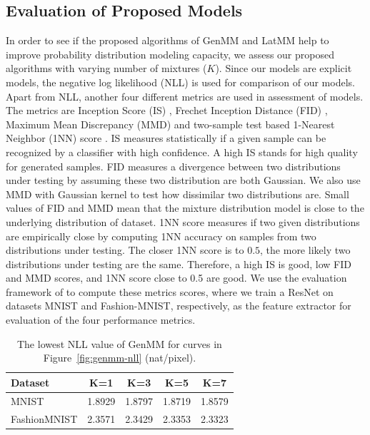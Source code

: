 \subsection{Evaluation of Proposed Models}\label{chpt6:sec:eval-metrics}
In order to see if the proposed algorithms of GenMM and LatMM help to improve probability distribution modeling capacity, we assess our proposed algorithms with varying number of mixtures ($K$). Since our models are explicit models, the negative log likelihood (NLL) is used for comparison of our models. Apart from NLL, another four different metrics are used in assessment of models.
The metrics are Inception Score (IS) \cite{NIPS2016_6125,2018arXiv180101973B,2018arXiv180607755X}, Frechet
Inception Distance (FID) \cite{2017arXiv170608500H}, Maximum Mean
Discrepancy (MMD) \cite{2018arXiv180607755X} and two-sample test based 1-Nearest
Neighbor (1NN) score \cite{2016arXiv161006545L}. IS measures statistically if a given sample can be recognized by a classifier with high confidence. A high IS stands for high quality for generated samples. FID measures a divergence between two distributions under testing by assuming these two distribution are both Gaussian. We also use MMD with Gaussian kernel to test how dissimilar two distributions are.
Small values of FID and MMD mean that the mixture distribution model
is close to the underlying distribution of dataset. 1NN score measures
if two given distributions are empirically close by computing 1NN accuracy
on samples from two distributions under testing. The closer 1NN score is to $0.5$, the more likely 
two distributions under testing are the same. Therefore, a high IS is good, low FID and MMD scores, and 1NN score close to 0.5 are good. We use the evaluation
framework of \cite{2018arXiv180607755X} to compute these metrics scores, where
we train a ResNet on datasets MNIST and Fashion-MNIST, respectively, as the feature extractor for evaluation of the four performance metrics.



\begin{table}
  \caption{The lowest NLL value of GenMM for curves in Figure~\ref{fig:genmm-nll} (nat/pixel).}
  \label{tab:lowestNLLgenMM}
   \centering
  \begin{tabular}{lcccc}
    \toprule
    {Dataset} & K=1 &  K=3 &  K=5 &  K=7 \\                                         
    \midrule                                                                                          MNIST &     1.8929 &    1.8797 &    1.8719 &    1.8579 \\
    FashionMNIST &   2.3571 &   2.3429 &   2.3353 &   2.3323 \\
    \bottomrule
  \end{tabular} 
\end{table}

